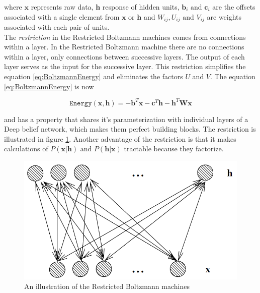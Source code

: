 where $\mathbf{x}$ represents raw data, $\mathbf{h}$ response of hidden units, $\mathbf{b}_i \text{ and } \mathbf{c}_i$ are the offsets associated with a single element from $\mathbf{x}$ or $\mathbf{h}$ and $W_{ij}, U_{ij} \text{ and } V_{ij}$ are weights associated with each pair of units. \\

The \textit{restriction} in the Restricted Boltzmann machines comes from connections within a layer. In the Restricted Boltzmann machine there are no connections within a layer, only connections between successive layers. The output of each layer serves as the input for the successive layer.  This restriction simplifies the equation \ref{eq:BoltzmannEnergy} and eliminates the factors $U$ and $V$. The equation \ref{eq:BoltzmannEnergy} is now

\begin{equation}
	\mathtt{Energy}(\mathbf{x}, \mathbf{h}) = -\mathbf{b}^T\mathbf{x} - \mathbf{c}^T\mathbf{h} - \mathbf{h}^T\mathbf{W}\mathbf{x} 
	\label{eq:RestBoltzmannEnergy}
\end{equation}

and has a property that shares it's parameterization with individual layers of a Deep belief network, which makes them perfect building blocks. The restriction is illustrated in figure \ref{img:RestBoltzMach}. Another advantage of the restriction is that it makes calculations of $P(\mathbf{x} | \mathbf{h}) \text{ and } P(\mathbf{h} | \mathbf{x})$ tractable because they factorize.

\begin{figure}
	\begin{center}
		\includegraphics[scale=0.5]{Figures/describing/restricted_boltzmann_machines}
	\end{center}
	\caption{An illustration of the Restricted Boltzmann machines}
	\label{img:RestBoltzMach}
\end{figure}


